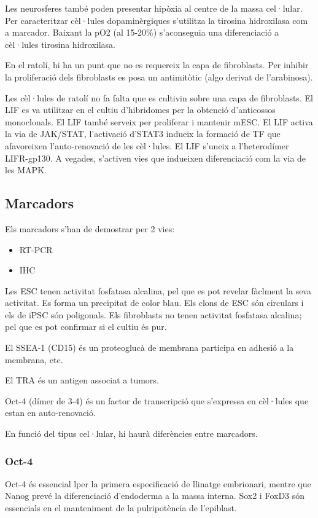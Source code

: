 Les neurosferes també poden presentar hipòxia al centre de la massa cel·lular. Per caracteritzar cèl·lules dopaminèrgiques s'utilitza la tirosina hidroxilasa com a marcador. Baixant la pO2 (al 15-20\%) s'aconseguia una diferenciació a cèl·lules tirosina hidroxilasa.

En el ratolí, hi ha un punt que no es requereix la capa de fibroblasts. Per inhibir la proliferació dels fibroblasts es posa un antimitòtic (algo derivat de l'arabinosa).

Les cèl·lules de ratolí no fa falta que es cultivin sobre una capa de fibroblasts. El LIF es va utilitzar en el cultiu d'hibridomes per la obtenció d'anticossos monoclonals. El LIF també serveix per proliferar i mantenir mESC. El LIF activa la via de JAK/STAT, l'activació d'STAT3 indueix la formació de TF que afavoreixen l'auto-renovació de les cèl·lules. El LIF s'uneix a l'heterodímer LIFR-gp130. A vegades, s'activen vies que indueixen diferenciació com la via de les MAPK.

\subsection{Marcadors}
Els marcadors s'han de demostrar per 2 vies:
\begin{itemize}
\item RT-PCR
\item IHC
\end{itemize}

Les ESC tenen activitat fosfatasa alcalina, pel que es pot revelar fàclment la seva activitat. Es forma un precipitat de color blau. Els clons de ESC són circulars i els de iPSC són poligonals. Els fibroblasts no tenen activitat fosfatasa alcalina; pel que es pot confirmar si el cultiu és pur.

El SSEA-1 (CD15) és un proteoglucà de membrana participa en adhesió a la membrana, etc. 

El TRA és un antigen associat a tumors. 

Oct-4 (dímer de 3-4) és un factor de transcripció que s'expressa en cèl·lules que estan en auto-renovació.

En funció del tipus cel·lular, hi haurà diferències entre marcadors.

\subsubsection{Oct-4}
Oct-4 és essencial lper la primera especificació de llinatge embrionari, mentre que Nanog prevé la diferenciació d'endoderma a la massa interna. Sox2 i FoxD3 són essencials en el manteniment de la pulripotència de l'epiblast.

